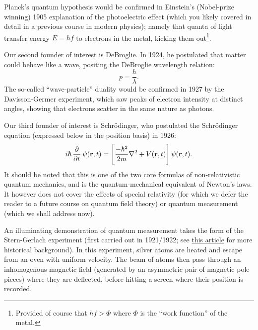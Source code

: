 Planck's quantum hypothesis would be confirmed in Einstein's (Nobel-prize winning) 1905 explanation of the photoelectric effect (which you likely covered in detail in a previous course in modern physics); namely that quanta of light transfer energy $E = hf$ to electrons in the metal, kicking them out\footnote{Provided of course that $hf > \Phi$ where $\Phi$ is the ``work function'' of the metal.}.

Our second founder of interest is DeBroglie. In 1924, he postulated that matter could behave like a wave, positing the DeBroglie wavelength relation:
\begin{equation}
    p = \frac{h}{\lambda}.
\end{equation}
The so-called ``wave-particle'' duality would be confirmed in 1927 by the Davisson-Germer experiment, which saw peaks of electron intensity at distinct angles, showing that electrons scatter in the same nature as photons.

Our third founder of interest is Schr\"{o}dinger, who postulated the Schr\"{o}dinger equation (expressed below in the position basis) in 1926:
\begin{equation}\label{eq-SEintro}
    i\hbar \dpd{}{t}\psi(\v{r}, t) = \left[\frac{-\hbar^2}{2m}\nabla^2 + V(\v{r}, t)\right] \psi(\v{r}, t).
\end{equation}
It should be noted that this is one of the two core formulas of non-relativistic quantum mechanics, and is the quantum-mechanical equivalent of Newton's laws. It however does not cover the effects of special relativity (for which we defer the reader to a future course on quantum field theory) or quantum measurement (which we shall address now). 

An illuminating demonstration of quantum measurement takes the form of the Stern-Gerlach experiment (first carried out in 1921/1922; see \href{https://physicstoday.scitation.org/doi/10.1063/1.1650229}{this article} for more historical background). In this experiment, silver atoms are heated and escape from an oven with uniform velocity. The beam of atoms then pass through an inhomogenous magnetic field (generated by an asymmetric pair of magnetic pole pieces) where they are deflected, before hitting a screen where their position is recorded. 


